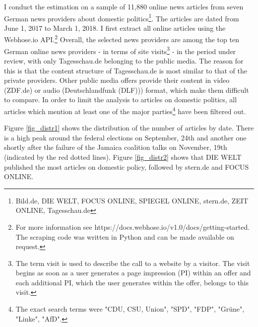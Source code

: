\documentclass[12pt,a4paper,notitlepage]{article}
\begin{document}
I conduct the estimation on a sample of 11,880 online news articles from seven German news providers about domestic politics\footnote{Bild.de, DIE WELT, FOCUS ONLINE, SPIEGEL ONLINE, stern.de, ZEIT ONLINE, Tagesschau.de}. The articles are dated from June 1, 2017 to March 1, 2018. I first extract all online articles using the Webhose.io API.\footnote{For more information see https://docs.webhose.io/v1.0/docs/getting-started. The scraping code was written in Python and can be made available on request.} Overall, the selected news providers are among the top ten German online news providers - in terms of site visits\footnote{The term visit is used to describe the call to a website by a visitor. The visit begins as soon as a user generates a page impression (PI) within an offer and each additional PI, which the user generates within the offer, belongs to this visit.} - in the period under review, with only Tagesschau.de belonging to the public media. The reason for this is that the content structure of Tagesschau.de is most similar to that of the private providers. Other public media offers provide their content in video (ZDF.de) or audio (Deutschlandfunk (DLF))) format, which make them difficult to compare. In order to limit the analysis to articles on domestic politics, all articles which mention at least one of the major parties\footnote{The exact search terms were "CDU, CSU, Union", "SPD", "FDP", "Grüne", "Linke", "AfD".} have been filtered out. 

 Figure \ref{fig_distr1} shows the distribution of the number of articles by date. There is a high peak around the federal elections on September, 24th and another one shortly after the failure of the Jamaica coalition talks on November, 19th (indicated by the red dotted lines). Figure \ref{fig_distr2} shows that DIE WELT published the most articles on domestic policy, followed by stern.de and FOCUS ONLINE.  
\end{document}
